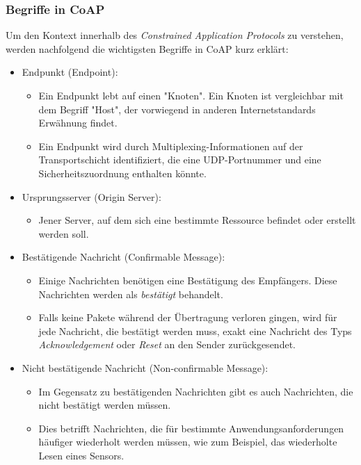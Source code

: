 \subsubsection{Begriffe in CoAP}
\label{subsubsec:begiffe-in-coap}

Um den Kontext innerhalb des \textit{Constrained Application Protocols} zu verstehen, werden nachfolgend die wichtigsten Begriffe in CoAP kurz erklärt:
\begin{itemize}
    \item Endpunkt (Endpoint):
          \begin{itemize}
              \item Ein Endpunkt lebt auf einen "Knoten". Ein Knoten ist vergleichbar mit dem Begriff "Host", der vorwiegend in anderen Internetstandards Erwähnung findet.
              \item Ein Endpunkt wird durch Multiplexing-Informationen auf der Transportschicht identifiziert, die eine UDP-Portnummer und eine Sicherheitszuordnung enthalten könnte.
          \end{itemize}
    \item Ursprungsserver (Origin Server):
          \begin{itemize}
              \item Jener Server, auf dem sich eine bestimmte Ressource befindet oder erstellt werden soll.
          \end{itemize}
    \item Bestätigende Nachricht (Confirmable Message):
          \begin{itemize}
              \item Einige Nachrichten benötigen eine Bestätigung des Empfängers. Diese Nachrichten werden als \textit{bestätigt} behandelt.
              \item Falls keine Pakete während der Übertragung verloren gingen, wird für jede Nachricht, die bestätigt werden muss, exakt eine Nachricht des Typs \textit{Acknowledgement} oder \textit{Reset} an den Sender zurückgesendet.
          \end{itemize}
    \item Nicht bestätigende Nachricht (Non-confirmable Message):
          \begin{itemize}
              \item Im Gegensatz zu bestätigenden Nachrichten gibt es auch Nachrichten, die nicht bestätigt werden müssen.
              \item Dies betrifft Nachrichten, die für bestimmte Anwendungsanforderungen häufiger wiederholt werden müssen, wie zum Beispiel, das wiederholte Lesen eines Sensors.

\end{itemize}
\end{itemize}
